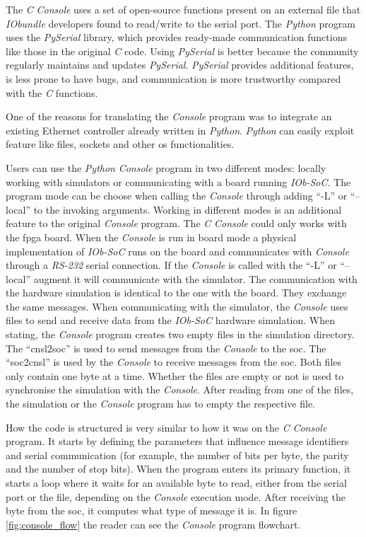 The \textit{C} \textit{Console} uses a set of open-source functions present on an external file that \textit{IObundle} developers found to read/write to the serial port. The \textit{Python} program uses the \textit{PySerial} library, which provides ready-made communication functions like those in the original \textit{C} code. Using \textit{PySerial} is better because the community regularly maintains and updates \textit{PySerial}. \textit{PySerial} provides additional features, is less prone to have bugs, and communication is more trustworthy compared with the \textit{C} functions.

One of the reasons for translating the \textit{Console} program was to integrate an existing Ethernet controller already written in \textit{Python}. \textit{Python} can easily exploit feature like files, sockets and other \acrfull{os} functionalities.

Users can use the \textit{Python} \textit{Console} program in two different modes: locally working with simulators or communicating with a board running \textit{IOb-SoC}. The program mode can be choose when calling the \textit{Console} through adding \enquote{-L} or \enquote{--local} to the invoking arguments. Working in different modes is an additional feature to the original \textit{Console} program. The \textit{C} \textit{Console} could only works with the \acrshort{fpga} board. When the \textit{Console} is run in board mode a physical implementation of \textit{IOb-SoC} runs on the board and communicates with \textit{Console} through a \textit{RS-232} serial connection. If the \textit{Console} is called with the \enquote{-L} or \enquote{--local} augment it will communicate with the simulator. The communication with the hardware simulation is identical to the one with the board. They exchange the same messages. When communicating with the simulator, the \textit{Console} uses files to send and receive data from the \textit{IOb-SoC} hardware simulation. When stating, the \textit{Console} program creates two empty files in the simulation directory. The \enquote{cnsl2soc} is used to send messages from the \textit{Console} to the \acrshort{soc}. The \enquote{soc2cnsl} is used by the \textit{Console} to receive messages from the \acrshort{soc}. Both files only contain one byte at a time. Whether the files are empty or not is used to synchronise the simulation with the \textit{Console}. After reading from one of the files, the simulation or the \textit{Console} program has to empty the respective file.

How the code is structured is very similar to how it was on the \textit{C} \textit{Console} program. It starts by defining the parameters that influence message identifiers and serial communication (for example, the number of bits per byte, the parity and the number of stop bits). When the program enters its primary function, it starts a loop where it waits for an available byte to read, either from the serial port or the file, depending on the \textit{Console} execution mode. After receiving the byte from the \acrshort{soc}, it computes what type of message it is. In figure \ref*{fig:console_flow} the reader can see the \textit{Console} program flowchart.

